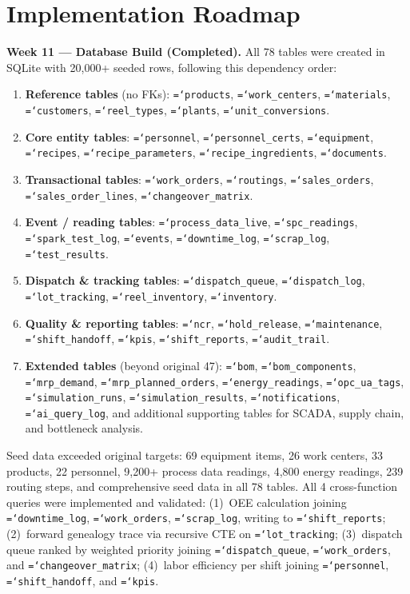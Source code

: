 \documentclass[11pt]{article}
\newcommand{\tfield}[1]{\texttt{\hyphenchar\font=`\-\relax #1}}
\begin{document}
\section{Implementation Roadmap}\label{sec:roadmap}

\textbf{Week 11 --- Database Build (Completed).}
All 78 tables were created in SQLite with 20{,}000+ seeded rows, following this dependency order:

\begin{enumerate}[leftmargin=2em, itemsep=1pt]
\item \textbf{Reference tables} (no FKs): \tfield{products}, \tfield{work\_centers}, \tfield{materials}, \tfield{customers}, \tfield{reel\_types}, \tfield{plants}, \tfield{unit\_conversions}.
\item \textbf{Core entity tables}: \tfield{personnel}, \tfield{personnel\_certs}, \tfield{equipment}, \tfield{recipes}, \tfield{recipe\_\allowbreak parameters}, \tfield{recipe\_ingredients}, \tfield{documents}.
\item \textbf{Transactional tables}: \tfield{work\_orders}, \tfield{routings}, \tfield{sales\_orders}, \tfield{sales\_order\_lines}, \tfield{changeover\_matrix}.
\item \textbf{Event / reading tables}: \tfield{process\_data\_live}, \tfield{spc\_readings}, \tfield{spark\_test\_log}, \tfield{events}, \tfield{downtime\_log}, \tfield{scrap\_log}, \tfield{test\_results}.
\item \textbf{Dispatch \& tracking tables}: \tfield{dispatch\_queue}, \tfield{dispatch\_log}, \tfield{lot\_tracking}, \tfield{reel\_inventory}, \tfield{inventory}.
\item \textbf{Quality \& reporting tables}: \tfield{ncr}, \tfield{hold\_release}, \tfield{maintenance}, \tfield{shift\_handoff}, \tfield{kpis}, \tfield{shift\_reports}, \tfield{audit\_trail}.
\item \textbf{Extended tables} (beyond original 47): \tfield{bom}, \tfield{bom\_components}, \tfield{mrp\_demand}, \tfield{mrp\_planned\_orders}, \tfield{energy\_readings}, \tfield{opc\_ua\_tags}, \tfield{simulation\_runs}, \tfield{simulation\_results}, \tfield{notifications}, \tfield{ai\_query\_log}, and additional supporting tables for SCADA, supply chain, and bottleneck analysis.
\end{enumerate}

Seed data exceeded original targets: 69 equipment items, 26 work centers, 33 products, 22 personnel, 9{,}200+ process data readings, 4{,}800 energy readings, 239 routing steps, and comprehensive seed data in all 78 tables.  All 4 cross-function queries were implemented and validated: (1)~OEE calculation joining \tfield{downtime\_log}, \tfield{work\_orders}, \tfield{scrap\_log}, writing to \tfield{shift\_reports}; (2)~forward genealogy trace via recursive CTE on \tfield{lot\_tracking}; (3)~dispatch queue ranked by weighted priority joining \tfield{dispatch\_queue}, \tfield{work\_orders}, and \tfield{changeover\_matrix}; (4)~labor efficiency per shift joining \tfield{personnel}, \tfield{shift\_handoff}, and \tfield{kpis}.
\end{document}
